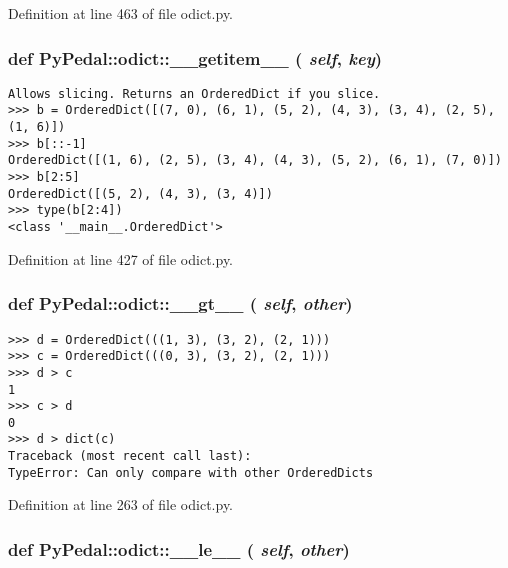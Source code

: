 Definition at line 463 of file odict.py.\hypertarget{namespacePyPedal_1_1odict_eeb1e091b0c6cb93f4de06806a88a744}{
\subsubsection{\setlength{\rightskip}{0pt plus 5cm}def PyPedal::odict::\_\-\_\-getitem\_\-\_\- ( {\em self},  {\em key})}}
\label{namespacePyPedal_1_1odict_eeb1e091b0c6cb93f4de06806a88a744}




\footnotesize\begin{verbatim}
Allows slicing. Returns an OrderedDict if you slice.
>>> b = OrderedDict([(7, 0), (6, 1), (5, 2), (4, 3), (3, 4), (2, 5), (1, 6)])
>>> b[::-1]
OrderedDict([(1, 6), (2, 5), (3, 4), (4, 3), (5, 2), (6, 1), (7, 0)])
>>> b[2:5]
OrderedDict([(5, 2), (4, 3), (3, 4)])
>>> type(b[2:4])
<class '__main__.OrderedDict'>
\end{verbatim}
\normalsize
 

Definition at line 427 of file odict.py.\hypertarget{namespacePyPedal_1_1odict_5fd1396966178d5edfb09a4aca844511}{
\subsubsection{\setlength{\rightskip}{0pt plus 5cm}def PyPedal::odict::\_\-\_\-gt\_\-\_\- ( {\em self},  {\em other})}}
\label{namespacePyPedal_1_1odict_5fd1396966178d5edfb09a4aca844511}




\footnotesize\begin{verbatim}
>>> d = OrderedDict(((1, 3), (3, 2), (2, 1)))
>>> c = OrderedDict(((0, 3), (3, 2), (2, 1)))
>>> d > c
1
>>> c > d
0
>>> d > dict(c)
Traceback (most recent call last):
TypeError: Can only compare with other OrderedDicts
\end{verbatim}
\normalsize
 

Definition at line 263 of file odict.py.\hypertarget{namespacePyPedal_1_1odict_07dd9f13756f6c1c4a09757539a7d823}{
\subsubsection{\setlength{\rightskip}{0pt plus 5cm}def PyPedal::odict::\_\-\_\-le\_\-\_\- ( {\em self},  {\em other})}}
\label{namespacePyPedal_1_1odict_07dd9f13756f6c1c4a09757539a7d823}




